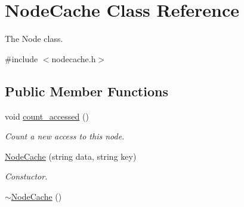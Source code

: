 \hypertarget{classNodeCache}{}\section{Node\+Cache Class Reference}
\label{classNodeCache}


The Node class.  




{\ttfamily \#include $<$nodecache.\+h$>$}

\subsection*{Public Member Functions}
\begin{DoxyCompactItemize}
\item 
void \hyperlink{classNodeCache_a7e621b939cdbc80967e6590b8ad86d73}{count\+\_\+accessed} ()\hypertarget{classNodeCache_a7e621b939cdbc80967e6590b8ad86d73}{}\label{classNodeCache_a7e621b939cdbc80967e6590b8ad86d73}

\begin{DoxyCompactList}\small\item\em Count a new access to this node. \end{DoxyCompactList}\item 
\hyperlink{classNodeCache_adec4f6cc00d2453f4da34c06e241d874}{Node\+Cache} (string data, string key)
\begin{DoxyCompactList}\small\item\em Constuctor. \end{DoxyCompactList}\item 
\hyperlink{classNodeCache_ad17fbdbc7a4fe97645919d7ebd88edbe}{$\sim$\+Node\+Cache} ()\hypertarget{classNodeCache_ad17fbdbc7a4fe97645919d7ebd88edbe}{}\label{classNodeCache_ad17fbdbc7a4fe97645919d7ebd88edbe}


\end{DoxyCompactItemize}
